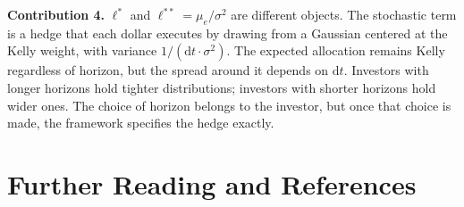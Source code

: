 \documentclass[11pt]{article}
\newcommand{\lopt}{\ell^{*}}
\newcommand{\lkelly}{\ell^{**}}
\newcommand{\mue}{\mu_{e}}
\newcommand{\dd}{\mathrm{d}}
\begin{document}
\textbf{Contribution 4.} $\lopt$ and $\lkelly = \mue/\sigma^{2}$
are different objects. The stochastic term is a hedge that each
dollar executes by drawing from a Gaussian centered at the Kelly
weight, with variance $1/(\dd t\cdot\sigma^{2})$. The expected
allocation remains Kelly regardless of horizon, but the spread around
it depends on $\dd t$. Investors with longer horizons hold tighter
distributions; investors with shorter horizons hold wider ones. The
choice of horizon belongs to the investor, but once that choice is
made, the framework specifies the hedge exactly.

\newpage
\section{Further Reading and References}
\end{document}
